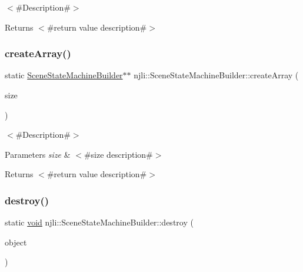 $<$\#\+Description\#$>$

\begin{DoxyReturn}{Returns}
$<$\#return value description\#$>$ 
\end{DoxyReturn}
\mbox{\label{classnjli_1_1_scene_state_machine_builder_ae0350a99b5be771c5e981fee2748ca1f}} 
\subsubsection{\texorpdfstring{create\+Array()}{createArray()}}
{\footnotesize\ttfamily static \mbox{\hyperlink{classnjli_1_1_scene_state_machine_builder}{Scene\+State\+Machine\+Builder}}$\ast$$\ast$ njli\+::\+Scene\+State\+Machine\+Builder\+::create\+Array (\begin{DoxyParamCaption}\item[{const \mbox{\hyperlink{_util_8h_a10e94b422ef0c20dcdec20d31a1f5049}{u32}}}]{size }\end{DoxyParamCaption})\hspace{0.3cm}{\ttfamily [static]}}

$<$\#\+Description\#$>$


\begin{DoxyParams}{Parameters}
{\em size} & $<$\#size description\#$>$\\
\hline
\end{DoxyParams}
\begin{DoxyReturn}{Returns}
$<$\#return value description\#$>$ 
\end{DoxyReturn}
\mbox{\label{classnjli_1_1_scene_state_machine_builder_a702e8dc5d3aa03f19fd59420c3a8e662}} 
\subsubsection{\texorpdfstring{destroy()}{destroy()}}
{\footnotesize\ttfamily static \mbox{\hyperlink{_thread_8h_af1e856da2e658414cb2456cb6f7ebc66}{void}} njli\+::\+Scene\+State\+Machine\+Builder\+::destroy (\begin{DoxyParamCaption}\item[{\mbox{\hyperlink{classnjli_1_1_scene_state_machine_builder}{Scene\+State\+Machine\+Builder}} $\ast$}]{object }\end{DoxyParamCaption})\hspace{0.3cm}{\ttfamily [static]}}


